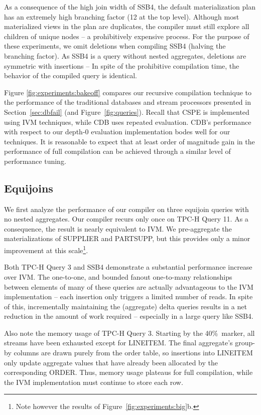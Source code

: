 As a consequence of the high join width of SSB4, the default materialization plan has an extremely high branching factor (12 at the top level).  Although most materialized views in the plan are duplicates, the compiler must still explore all children of unique nodes -- a prohibitively expensive process.  For the purpose of these experiments, we omit deletions when compiling SSB4 (halving the branching factor).  As SSB4 is a query without nested aggregates, deletions are symmetric with insertions -- In spite of the prohibitive compilation time, the behavior of the compiled query is identical.

Figure \ref{fig:experiments:bakeoff} compares our recursive compilation technique to the performance of the traditional databases and stream processors presented in Section~\ref{sec:dbfail} (and Figure~\ref{fig:queries}).  Recall that CSPE is implemented using IVM techniques, while CDB uses repeated evaluation.  CDB's performance with respect to our depth-0 evaluation implementation bodes well for our techniques.  It is reasonable to expect that at least order of magnitude gain in the performance of full compilation can be achieved through a similar level of performance tuning.

\subsection{Equijoins}

We first analyze the performance of our compiler on three equijoin queries with no nested aggregates.  Our compiler recurs only once on TPC-H Query 11.  As a consequence, the result is nearly equivalent to IVM.  We pre-aggregate the materializations of SUPPLIER and PARTSUPP, but this provides only a minor improvement at this scale\footnote{Note however the results of Figure~\ref{fig:experiments:big}b.}.  

Both TPC-H Query 3 and SSB4 demonstrate a substantial performance increase over IVM.  The one-to-one, and bounded fanout one-to-many relationships between elements of many of these queries are actually advantageous to the IVM implementation -- each insertion only triggers a limited number of reads.  In spite of this, incrementally maintaining the (aggregate) delta queries results in a net reduction in the amount of work required -- especially in a large query like SSB4.

Also note the memory usage of TPC-H Query 3.  Starting by the 40\%\ marker, all streams have been exhausted except for LINEITEM.  The final aggregate's group-by columns are drawn purely from the order table, so insertions into LINEITEM only update aggregate values that have already been allocated by the corresponding ORDER.  Thus, memory usage plateaus for full compilation, while the IVM implementation must continue to store each row.

